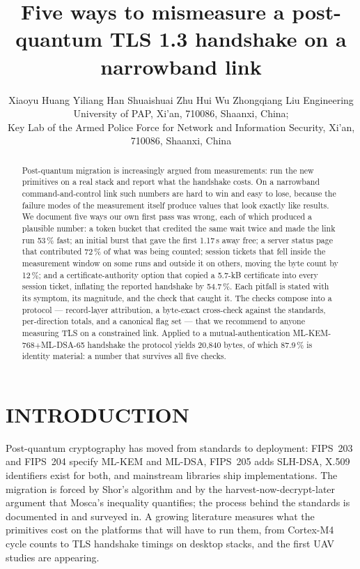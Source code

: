 \documentclass[]{spie}  %
\title{Five ways to mismeasure a post-quantum TLS 1.3 handshake
on a narrowband link}
\author{Xiaoyu Huang\supit{ab,*} \quad Yiliang Han\supit{ab} \quad
Shuaishuai Zhu\supit{ab} \quad Hui Wu\supit{ab} \quad
Zhongqiang Liu\supit{ab}
\skiplinehalf
\supit{a}Engineering University of PAP, Xi'an, 710086, Shaanxi, China; \\
\supit{b}Key Lab of the Armed Police Force for Network and Information
Security, Xi'an, 710086, Shaanxi, China
}
\begin{document}
\maketitle

\begin{abstract}
Post-quantum migration is increasingly argued from measurements: run the
new primitives on a real stack and report what the handshake costs. On a
narrowband command-and-control link such numbers are hard to win and easy
to lose, because the failure modes of the measurement itself produce
values that look exactly like results. We document five ways our own
first pass was wrong, each of which produced a plausible number: a token
bucket that credited the same wait twice and made the link run 53\,\%
fast; an initial burst that gave the first 1.17\,s away free; a server
status page that contributed 72\,\% of what was being counted; session
tickets that fell inside the measurement window on some runs and outside
it on others, moving the byte count by 12\,\%; and a certificate-authority
option that copied a 5.7-kB certificate into every session ticket,
inflating the reported handshake by 54.7\,\%. Each pitfall is stated with
its symptom, its magnitude, and the check that caught it. The checks
compose into a protocol --- record-layer attribution, a byte-exact
cross-check against the standards, per-direction totals, and a canonical
flag set --- that we recommend to anyone measuring TLS on a constrained
link. Applied to a mutual-authentication ML-KEM-768$+$ML-DSA-65 handshake
the protocol yields 20{,}840 bytes, of which 87.9\,\% is identity
material: a number that survives all five checks.
\end{abstract}


\section{INTRODUCTION}
\label{sec:intro}

Post-quantum cryptography has moved from standards to deployment:
FIPS~203 and FIPS~204 specify ML-KEM and ML-DSA\cite{fips203,fips204},
FIPS~205 adds SLH-DSA\cite{fips205}, X.509 identifiers exist for
both\cite{rfc9881,rfc9909}, and mainstream libraries ship
implementations\cite{openssl35}. The migration is forced by Shor's
algorithm\cite{shor1997} and by the harvest-now-decrypt-later argument
that Mosca's inequality quantifies\cite{mosca2018}; the process behind
the standards is documented in\cite{nistir8105} and surveyed
in\cite{bernstein2017,pqcryptoBook}. A growing literature measures what
the primitives cost on the platforms that will have to run them, from
Cortex-M4 cycle counts\cite{pqm4,botros2019} to TLS handshake timings on
desktop stacks\cite{paquin2020,sikeridis2020ndss}, and the first UAV
studies are appearing\cite{xia2024ligkyx,hussien2026pqmavlink}.
\end{document}
